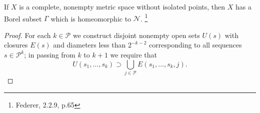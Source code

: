 \begin{theorem}
If $X$ is a complete, nonempty metric space without isolated points, then 
$X$ has a Borel subset $\Gamma$ which is homeomorphic to 
$\mathcal{N}$. \footnote{Federer, 2.2.9, p.65}
\end{theorem}
\begin{proof}
For each $k\in\mathcal{P}$ we construct disjoint nonempty open sets
$U(s)$ with closures $E(s)$ and diameters less than $2^{-k-2}$ corresponding to
all sequences $s\in\mathcal{P}^k$; in passing from $k$ to $k+1$ we require that 
\[
	U(s_1,\dots,s_k) \supset \bigcup_{j\in\mathcal{P}} E(s_1,\dots,s_k,j).
\]



\end{proof}
